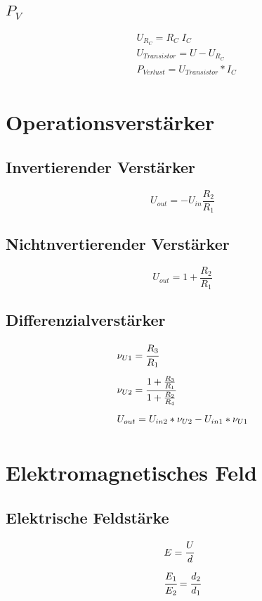 \documentclass[12pt,a5paper,ngerman,titlepage]{article}
\begin{document}
\subsection{$P_{V}$}
\begin{align*}
& U_{R_{C}} = R_{C} \; I_{C}\\[5pt]
& U_{Transistor} = U-U_{R_{C}}\\[5pt]
& P_{Verlust} = U_{Transistor} * I_{C}\\[5pt]
\end{align*}

\newpage
\section{Operationsverstärker}
\subsection{Invertierender Verstärker}

$$U_{out}=-U_{in}\frac{R_{2}}{R_{1}}$$

\subsection{Nichtnvertierender Verstärker}
$$U_{out}=1+\frac{R_{2}}{R_{1}}$$

\newpage
\subsection{Differenzialverstärker}
\begin{align*}
&\nu_{U1} = \cfrac{R_{3}}{R_{1}} \\[5pt]
&\nu_{U2} = \cfrac{1+ \frac{R_{3}}{R_{1}}}{1+ \frac{R_{2}}{R_{4}}} \\[5pt]
&U_{out} = U_{in2}*\nu_{U2}-U_{in1}*\nu_{U1} \\[5pt]
\end{align*}
\newpage
\section{Elektromagnetisches Feld}

\subsection{Elektrische Feldstärke}
\begin{align*}
&E=\cfrac{U}{d} \\[5pt]
&\cfrac{E_{1}}{E_{2}}=\cfrac{d_{2}}{d_{1}} 
\end{align*}
\end{document}
